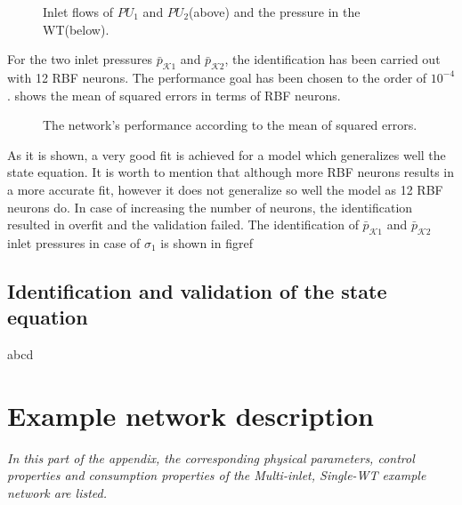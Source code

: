  \vspace{-5mm}

 \begin{figure}[H]
 \centering
 \hspace{-4.5mm}
  
 \vspace{-2.5mm}
 \caption{Inlet flows of $PU_1$ and $PU_2$(above) and the pressure in the WT(below).}
 \label{fig:WT_sigma1}
 \end{figure}

 \vspace{-3mm}

For the two inlet pressures $\bar{p}_{\mathcal{K}1}$ and $\bar{p}_{\mathcal{K}2}$, the identification has been carried out with 12 RBF neurons. The performance goal has been chosen to the order of $10^{-4}$.  shows the mean of squared errors in terms of RBF neurons. 

 \begin{figure}[H]
 \centering
  
 \vspace{-2.5mm}
 \caption{The network’s performance according to the mean of squared errors.}
 \label{fig:MSE_output}
 \end{figure}

 \vspace{-3mm}

As it is shown, a very good fit is achieved for a model which generalizes well the state equation. It is worth to mention that although more RBF neurons results in a more accurate fit, however it does not generalize so well the model as 12 RBF neurons do. In case of increasing the number of neurons, the identification resulted in overfit and the validation failed. The identification of $\bar{p}_{\mathcal{K}1}$ and $\bar{p}_{\mathcal{K}2}$ inlet pressures in case of $\sigma_1$ is shown in figref{}

\section{Identification and validation of the state equation}
\label{identification_and_validation_of_the_state_eq}  

abcd

\chapter{Example network description}
\label{physical_properties_example1}

\emph{In this part of the appendix, the corresponding physical parameters, control properties and consumption properties of the Multi-inlet, Single-WT example network are listed.}




